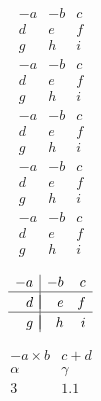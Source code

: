 \documentclass[letterpaper,notitlepage,11pt]{article}
\begin{document}
\[
\begin{array}{ccc}
-a & -b & c \\
d & e & f \\
g & h & i
\end{array}
\]
\[
\begin{array}{rrr}
-a & -b & c \\
d & e & f \\
g & h & i
\end{array}
\]
\[
\begin{array}{lll}
-a & -b & c \\
d & e & f \\
g & h & i
\end{array}
\]
\[
\begin{array}{rlc}
-a & -b & c \\
d & e & f \\
g & h & i
\end{array}
\]
\[
\begin{array}{r|rr}
-a & -b & c \\
d & e & f \\
g & h & i
\end{array}
\]

\[
\begin{array}{r|rr}
-a & -b & c \\
\hline\\[-1em]
d & e & f \\
\hline\\[-1em]
g & h & i
\end{array}
\]

\[
\begin{array}{||r|r||}
-a \times b & c + d \\
\alpha & \gamma \\
\hline
3 & 1.1
\end{array}
\]

\newpage
\end{document}
